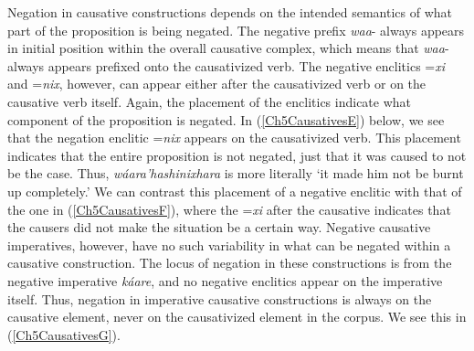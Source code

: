 Negation in causative constructions depends on the intended semantics of what part of the proposition is being negated. The negative prefix \textit{waa}- always appears in initial position within the overall causative complex, which means that \textit{waa}- always appears prefixed onto the causativized verb. The negative enclitics =\textit{xi} and =\textit{nix}, however, can appear either after the causativized verb or on the causative verb itself. Again, the placement of the enclitics indicate what component of the proposition is negated. In (\ref{Ch5CausativesE}) below, we see that the negation enclitic =\textit{nix} appears on the causativized verb. This placement indicates that the entire proposition is not negated, just that it was caused to not be the case. Thus, \textit{wáara'hashinixhara} is more literally `it made him not be burnt up completely.' We can contrast this placement of a negative enclitic with that of the one in (\ref{Ch5CausativesF}), where the =\textit{xi} after the causative indicates that the causers did not make the situation be a certain way. Negative causative imperatives, however, have no such variability in what can be negated within a causative construction. The locus of negation in these constructions is from the negative imperative \textit{káare}, and no negative enclitics appear on the imperative itself. Thus, negation in imperative causative constructions is always on the causative element, never on the causativized element in the corpus. We see this in (\ref{Ch5CausativesG}).

